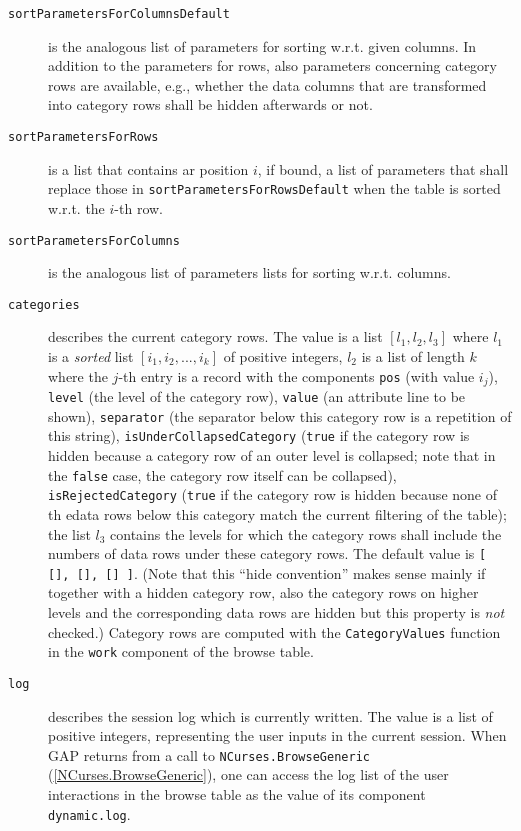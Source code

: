 \documentclass[a4paper,11pt]{report}
\begin{document}
{{{\begin{description}
\item[{\texttt{sortParametersForColumnsDefault}}]  is the analogous list of parameters for sorting w.r.t. given columns. In
addition to the parameters for rows, also parameters concerning category rows
are available, e.{\nobreakspace}g., whether the data columns that are
transformed into category rows shall be hidden afterwards or not. 
\item[{\texttt{sortParametersForRows}}]  is a list that contains ar position $i$, if bound, a list of parameters that shall replace those in \texttt{sortParametersForRowsDefault} when the table is sorted w.r.t. the $i$-th row. 
\item[{\texttt{sortParametersForColumns}}]  is the analogous list of parameters lists for sorting w.r.t. columns. 
\item[{\texttt{categories}}]  describes the current category rows. The value is a list $[ l_1, l_2, l_3 ]$ where $l_1$ is a \emph{sorted} list $[ i_1, i_2, ..., i_k ]$ of positive integers, $l_2$ is a list of length $k$ where the $j$-th entry is a record with the components \texttt{pos} (with value $i_j$), \texttt{level} (the level of the category row), \texttt{value} (an attribute line to be shown), \texttt{separator} (the separator below this category row is a repetition of this string), \texttt{isUnderCollapsedCategory} (\texttt{true} if the category row is hidden because a category row of an outer level is
collapsed; note that in the \texttt{false} case, the category row itself can be collapsed), \texttt{isRejectedCategory} (\texttt{true} if the category row is hidden because none of th edata rows below this
category match the current filtering of the table); the list $l_3$ contains the levels for which the category rows shall include the numbers of
data rows under these category rows. The default value is \texttt{[ [], [], [] ]}. (Note that this ``hide convention'' makes sense mainly if together with a hidden category row, also the category
rows on higher levels and the corresponding data rows are hidden
{\textendash}but this property is \emph{not} checked.) Category rows are computed with the \texttt{CategoryValues} function in the \texttt{work} component of the browse table. 
\item[{\texttt{log}}]  describes the session log which is currently written. The value is a list of
positive integers, representing the user inputs in the current session. When \textsf{GAP} returns from a call to \texttt{NCurses.BrowseGeneric} (\ref{NCurses.BrowseGeneric}), one can access the log list of the user interactions in the browse table as
the value of its component \texttt{dynamic.log}. 


\end{description}}}}
\end{document}
